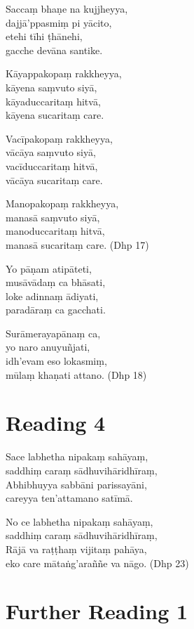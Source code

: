 Saccaṃ bhaṇe na kujjheyya,\\
dajjā’ppasmiṃ pi yācito,\\
etehi tīhi ṭhānehi,\\
gacche devāna santike.

Kāyappakopaṃ rakkheyya,\\
kāyena saṃvuto siyā,\\
kāyaduccaritaṃ hitvā,\\
kāyena sucaritaṃ care.

Vacīpakopaṃ rakkheyya,\\
vācāya saṃvuto siyā,\\
vacīduccaritaṃ hitvā,\\
vācāya sucaritaṃ care.

Manopakopaṃ rakkheyya,\\
manasā saṃvuto siyā,\\
manoduccaritaṃ hitvā,\\
manasā sucaritaṃ care. \hfill(Dhp 17)

Yo pāṇam atipāteti,\\
musāvādaṃ ca bhāsati,\\
loke adinnaṃ ādiyati,\\
paradāraṃ ca gacchati.

Surāmerayapānaṃ ca,\\
yo naro anuyuñjati,\\
idh’evam eso lokasmiṃ,\\
mūlaṃ khaṇati attano. \hfill(Dhp 18)

\section*{Reading 4}

Sace labhetha nipakaṃ sahāyaṃ,\\
saddhiṃ caraṃ sādhuvihāridhīraṃ,\\
Abhibhuyya sabbāni parissayāni,\\
careyya ten’attamano satīmā.

No ce labhetha nipakaṃ sahāyaṃ,\\
saddhiṃ caraṃ sādhuvihāridhīraṃ,\\
Rājā va raṭṭhaṃ vijitaṃ pahāya,\\
eko care mātaṅg’araññe va nāgo. \hfill(Dhp 23)

\section*{Further Reading 1}

